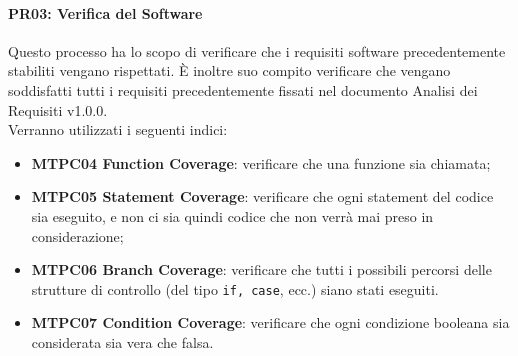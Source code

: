\iffalse
\paragraph{MTPC04 Cost Variance(CV)}\-\\
Indice che quantifica la produttività o efficienza monitorando se il valore del costo realmente maturato è minore, maggiore o uguale al costo effettivo.
Calcolo:
\begin{center}
	\item \textbf{CV = BCWP - ACWP}
\end{center}
dove:
\begin{itemize}
	\item BCWP: valore delle attività realizzate alla data odierna(in euro o giorni);
	\item ACWP: costo effettivo sostenuto per completare le attività alla data odierna(in euro o giorni).
\end{itemize}
Se CV > 0 significa che il progetto produce con maggior efficienza e minor costo.
\fi

\paragraph{PR03: Verifica del Software}
Questo processo ha lo scopo di verificare che i requisiti software precedentemente stabiliti vengano rispettati. È inoltre suo compito verificare che vengano soddisfatti
tutti i requisiti precedentemente fissati nel documento Analisi dei Requisiti v1.0.0. \-\\ Verranno utilizzati i seguenti indici:

\begin{itemize}
	\item \textbf{MTPC04 Function Coverage}: verificare che una funzione sia chiamata;
	\item \textbf{MTPC05 Statement Coverage}: verificare che ogni statement del codice sia eseguito, e non ci sia quindi codice che non verrà mai preso in considerazione;
	\item \textbf{MTPC06 Branch Coverage}: verificare che tutti i possibili percorsi delle strutture di controllo (del tipo \texttt{if, case}, ecc.) siano stati eseguiti.
	\item \textbf{MTPC07 Condition Coverage}: verificare che ogni condizione booleana sia considerata sia vera che falsa.
\end{itemize}

